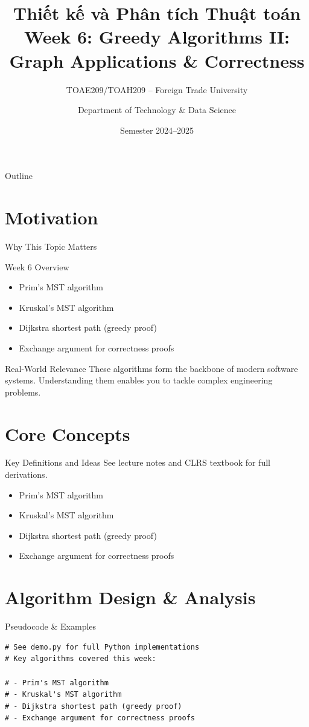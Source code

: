 \documentclass[aspectratio=169,xcolor=dvipsnames]{beamer}
\title[Algorithms -- Week 6]{\textbf{Thiết kế và Phân tích Thuật toán}\\
  \large Week 6: Greedy Algorithms II: Graph Applications & Correctness}
\subtitle{TOAE209/TOAH209 -- Foreign Trade University}
\author{Department of Technology \& Data Science}
\date{Semester 2024--2025}
\begin{document}
\begin{frame}\titlepage\end{frame}
\begin{frame}{Outline}\tableofcontents\end{frame}

\section{Motivation}
\begin{frame}{Why This Topic Matters}
  \begin{block}{Week 6 Overview}
    \begin{itemize}
    \item Prim's MST algorithm
    \item Kruskal's MST algorithm
    \item Dijkstra shortest path (greedy proof)
    \item Exchange argument for correctness proofs
    \end{itemize}
  \end{block}
  \begin{exampleblock}{Real-World Relevance}
    These algorithms form the backbone of modern software systems.
    Understanding them enables you to tackle complex engineering problems.
  \end{exampleblock}
\end{frame}

\section{Core Concepts}
\begin{frame}{Key Definitions and Ideas}
  See lecture notes and CLRS textbook for full derivations.
  \begin{itemize}
    \item Prim's MST algorithm
    \item Kruskal's MST algorithm
    \item Dijkstra shortest path (greedy proof)
    \item Exchange argument for correctness proofs
  \end{itemize}
\end{frame}

\section{Algorithm Design \& Analysis}
\begin{frame}[fragile]{Pseudocode \& Examples}
  \begin{lstlisting}
# See demo.py for full Python implementations
# Key algorithms covered this week:

# - Prim's MST algorithm
# - Kruskal's MST algorithm
# - Dijkstra shortest path (greedy proof)
# - Exchange argument for correctness proofs
  \end{lstlisting}
\end{frame}
\end{document}
